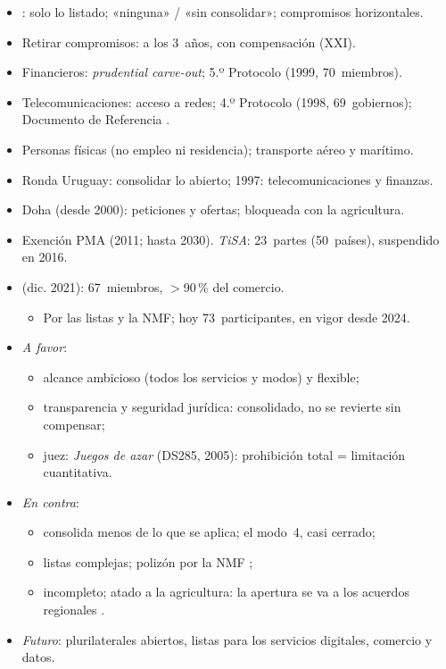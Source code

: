 \documentclass{article}
\begin{document}
\begin{columnas}
\begin{itemize}
\item {}: solo lo listado; «ninguna» / «sin consolidar»; compromisos horizontales.
\item Retirar compromisos: a los 3~años, con compensación (XXI).
\end{itemize}
\begin{itemize}
\item Financieros: \emph{prudential carve-out}; 5.º Protocolo (1999, 70~miembros).
\item Telecomunicaciones: acceso a redes; 4.º Protocolo (1998, 69~gobiernos); Documento de Referencia .
\item Personas físicas (no empleo ni residencia); transporte aéreo y marítimo.
\end{itemize}

\begin{itemize}
\item Ronda Uruguay: consolidar lo abierto; 1997: telecomunicaciones y finanzas.
\item Doha (desde 2000): peticiones y ofertas; bloqueada con la agricultura.
\item Exención PMA (2011; hasta 2030). \emph{TiSA}: 23~partes (50~países), suspendido en 2016.
\item {} (dic. 2021): 67~miembros, $>$90\,\% del comercio.
  \begin{itemize}
  \item Por las listas y la NMF; hoy 73~participantes, en vigor desde 2024.
  \end{itemize}
\end{itemize}

\begin{itemize}
\item \emph{A favor}:
  \begin{itemize}
  \item alcance ambicioso (todos los servicios y modos) y flexible;
  \item transparencia y seguridad jurídica: consolidado, no se revierte sin compensar;
  \item juez: \emph{Juegos de azar} (DS285, 2005): prohibición total = limitación cuantitativa.
  \end{itemize}
\item \emph{En contra}:
  \begin{itemize}
  \item consolida menos de lo que se aplica; el modo~4, casi cerrado;
  \item listas complejas; polizón por la NMF ;
  \item incompleto; atado a la agricultura: la apertura se va a los acuerdos regionales .
  \end{itemize}
\item \emph{Futuro}: plurilaterales abiertos, listas para los servicios digitales, comercio y datos.
\end{itemize}


\end{columnas}
\end{document}
